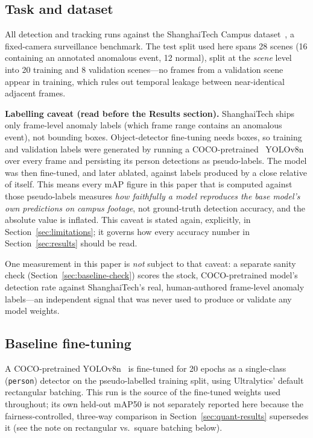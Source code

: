 \documentclass[11pt]{article}
\begin{document}
\subsection{Task and dataset}

All detection and tracking runs against the ShanghaiTech Campus
dataset~\cite{shanghaitech}, a fixed-camera surveillance benchmark. The test
split used here spans 28 scenes (16 containing an annotated anomalous event,
12 normal), split at the \emph{scene} level into 20 training and 8 validation
scenes---no frames from a validation scene appear in training, which rules
out temporal leakage between near-identical adjacent frames.

\textbf{Labelling caveat (read before the Results section).} ShanghaiTech
ships only frame-level anomaly labels (which frame range contains an
anomalous event), not bounding boxes. Object-detector fine-tuning needs
boxes, so training and validation labels were generated by running a
COCO-pretrained~\cite{coco} YOLOv8n over every frame and persisting its
person detections as pseudo-labels. The model was then fine-tuned, and later
ablated, against labels produced by a close relative of itself. This means
every mAP figure in this paper that is computed against those pseudo-labels
measures \emph{how faithfully a model reproduces the base model's own
predictions on campus footage}, not ground-truth detection accuracy, and the
absolute value is inflated. This caveat is stated again, explicitly, in
Section~\ref{sec:limitations}; it governs how every accuracy number in
Section~\ref{sec:results} should be read.

One measurement in this paper is \emph{not} subject to that caveat: a
separate sanity check (Section~\ref{sec:baseline-check}) scores the stock,
COCO-pretrained model's detection rate against ShanghaiTech's real,
human-authored frame-level anomaly labels---an independent signal that was
never used to produce or validate any model weights.

\subsection{Baseline fine-tuning}

A COCO-pretrained YOLOv8n~\cite{yolov8} is fine-tuned for 20 epochs as a
single-class (\texttt{person}) detector on the pseudo-labelled training
split, using Ultralytics' default rectangular batching. This run is the
source of the fine-tuned weights used throughout; its own held-out mAP50 is
not separately reported here because the fairness-controlled, three-way
comparison in Section~\ref{sec:quant-results} supersedes it (see the note on
rectangular vs.\ square batching below).
\end{document}
